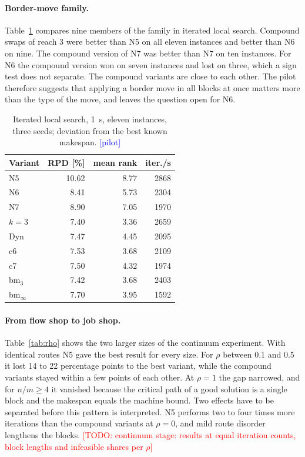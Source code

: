 \documentclass[10pt,twocolumn]{article}
\newcommand{\todo}[1]{\textcolor{red}{[TODO: #1]}}
\newcommand{\pilot}{\textcolor{blue}{[pilot]}}
\begin{document}
\paragraph{Border-move family.}
Table~\ref{tab:ils} compares nine members of the family in iterated local
search. Compound swaps of reach 3 were better than N5 on all eleven
instances and better than N6 on nine. The compound version of N7 was
better than N7 on ten instances. For N6 the compound version won on seven
instances and lost on three, which a sign test does not separate. The
compound variants are close to each other. The pilot therefore suggests
that applying a border move in all blocks at once matters more than the
type of the move, and leaves the question open for N6.

\begin{table}[t]
\centering\small
\begin{tabular}{@{}lrrr@{}}
\toprule
Variant & RPD [\%] & mean rank & iter./s \\
\midrule
N5        & 10.62 & 8.77 & 2868 \\
N6        & 8.41  & 5.73 & 2304 \\
N7        & 8.90  & 7.05 & 1970 \\
$k=3$     & 7.40  & 3.36 & 2659 \\
Dyn       & 7.47  & 4.45 & 2095 \\
c6        & 7.53  & 3.68 & 2109 \\
c7        & 7.50  & 4.32 & 1974 \\
bm$_3$    & 7.42  & 3.68 & 2403 \\
bm$_\infty$ & 7.70 & 3.95 & 1592 \\
\bottomrule
\end{tabular}
\caption{Iterated local search, 1~s, eleven instances, three seeds;
deviation from the best known makespan. \pilot}
\label{tab:ils}
\end{table}

\paragraph{From flow shop to job shop.}
Table~\ref{tab:rho} shows the two larger sizes of the continuum
experiment. With identical routes N5 gave the best result for every size.
For $\rho$ between 0.1 and 0.5 it lost 14 to 22 percentage points to the
best variant, while the compound variants stayed within a few points of
each other. At $\rho=1$ the gap narrowed, and for $n/m\ge4$ it vanished
because the critical path of a good solution is a single block and the
makespan equals the machine bound. Two effects have to be separated
before this pattern is interpreted. N5 performs two to four times more
iterations than the compound variants at $\rho=0$, and mild route disorder
lengthens the blocks. \todo{continuum stage: results at equal iteration
counts, block lengths and infeasible shares per $\rho$}
\end{document}
